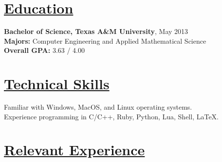 \documentclass[8pt]{res}
\begin{document}
 

  \address{\bf \underline{Current Address}\\216 Southpoint Crossing Dr.\\Durham, NC 27713}
  \address{\bf \underline{Contact Info}\\juanlb1988@gmail.com\\(254)-449-6995}

  \begin{resume}


    \section{\underline{Education}}          
    \textbf{Bachelor of Science, Texas A\&M University}, May 2013   \\       
    \textbf{Majors:} Computer Engineering and Applied Mathematical Science \\
    \textbf{Overall GPA:} 3.63 / 4.00     


    \section{\underline{Technical Skills}}        
    Familiar with Windows, MacOS, and Linux operating systems. \\
    Experience programming in C/C++, Ruby, Python, Lua, Shell, \LaTeX.


    \section{\underline{Relevant Experience}}
    \vspace{-0.08in}	


\end{resume}
\end{document}
